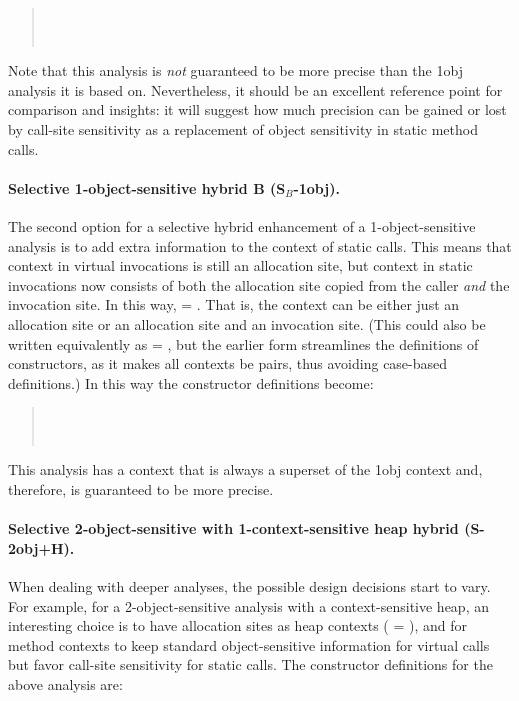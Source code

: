 \begin{quote}
 \\
 \\
\end{quote}

Note that this analysis is \emph{not} guaranteed to be more precise than the 1obj analysis it is based on. Nevertheless, it should be an excellent reference point for comparison and insights: it will suggest how much precision can be gained or lost by call-site sensitivity as a replacement of object sensitivity in static method calls.

\paragraph[Selective 1-object-sensitive (-B)]{Selective 1-object-sensitive hybrid B (S$_B$-1obj).}
The second option for a selective hybrid enhancement of a 1-object-sensitive analysis is to add extra information to the context of static calls. This means that context in virtual invocations is still an allocation site, but context in static invocations now consists of both the allocation site copied from the caller \emph{and} the invocation site. In this way,  = . That is, the context can be either just an allocation site or an allocation site and an invocation site. (This could also be written equivalently as  = , but the earlier form streamlines the definitions of constructors, as it makes all contexts be pairs, thus avoiding case-based definitions.)  In this way the constructor definitions become:

\begin{quote}
 \\
 \\
\end{quote}

This analysis has a context that is always a superset of the 1obj context and, therefore, is guaranteed to be more precise.

\paragraph[Selective 2-object-sensitive with 1-context-sensitive heap]{Selective 2-object-sensitive with 1-context-sensitive heap hybrid (S-2obj+H).}
When dealing with deeper analyses, the possible design decisions start to vary. For example, for a 2-object-sensitive analysis with a context-sensitive heap, an interesting choice is to have allocation sites as heap contexts ( = ), and for method contexts to keep standard object-sensitive information for virtual calls but favor call-site sensitivity for static calls. The constructor definitions for the above analysis are:

